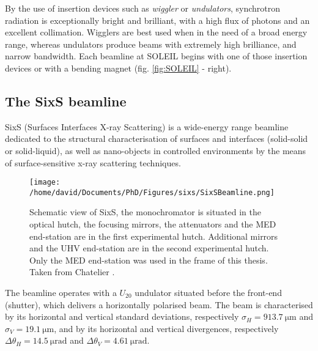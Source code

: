 By the use of insertion devices such as \textit{wiggler} or \textit{undulators}, synchrotron radiation is exceptionally bright and brilliant, with a high flux of photons and an excellent collimation.
Wigglers are best used when in the need of a broad energy range, whereas undulators produce beams with extremely high brilliance, and narrow bandwidth.
Each beamline at SOLEIL begins with one of those insertion devices or with a bending magnet (fig. \ref{fig:SOLEIL} - right).

\subsection{The SixS beamline}

SixS (Surfaces Interfaces X-ray Scattering) is a wide-energy range beamline dedicated to the structural characterisation of surfaces and interfaces (solid-solid or solid-liquid), as well as nano-objects in controlled environments by the means of surface-sensitive x-ray scattering techniques.

\begin{figure}[!htb]
    \centering
    \texttt{[image: /home/david/Documents/PhD/Figures/sixs/SixSBeamline.png]}
    \caption{
		Schematic view of SixS, the monochromator is situated in the optical hutch, the focusing mirrors, the attenuators and the MED end-station are in the first experimental hutch.
        Additional mirrors and the UHV end-station are in the second experimental hutch.
		Only the MED end-station was used in the frame of this thesis.
        Taken from Chatelier \parencite*{Chatelier2020}.
    }
    \label{fig:SixSBeamline}
\end{figure}

The beamline operates with a $U_{20}$ undulator situated before the front-end (shutter), which delivers a horizontally polarised beam.
The beam is characterised by its horizontal and vertical standard deviations, respectively $\sigma_H = \qty{913.7}{\um}$ and $\sigma_V = \qty{19.1}{\um}$, and by its horizontal and vertical divergences, respectively $\Delta\theta_H = \qty{14.5}{\micro\radian}$ and $\Delta\theta_V = \qty{4.61}{\micro\radian}$.

